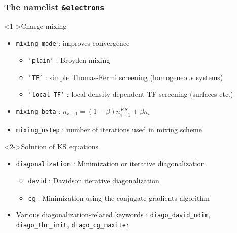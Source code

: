\documentclass[]{beamer}
\def\t#1{{\texttt{#1}}}
\begin{document}
\begin{frame}
  \frametitle{The namelist \t{\&electrons}}
  \begin{block}<1->{Charge mixing}
    \begin{itemize}
      \item \t{mixing\_mode} : improves convergence
        \begin{itemize}
          \item[] \t{'plain'} : Broyden mixing
          \item[] \t{'TF'} : simple Thomas-Fermi screening (homogeneous systems)
          \item[] \t{'local-TF'} : local-density-dependent TF screening
          (surfaces etc.)
        \end{itemize}
      \item \t{mixing\_beta} : $n_{i+1} = (1-\beta)n^{KS}_{i+1} + \beta n_i$
      \item \t{mixing\_nstep} : number of iterations used in mixing scheme
    \end{itemize}
  \end{block}

\begin{block}<2->{Solution of KS equations}
  \begin{itemize}
  \item \t{diagonalization} : Minimization or iterative diagonalization
    \begin{itemize}
    \item[] \t{david} : Davidson iterative diagonalization
    \item[] \t{cg} : Minimization using the conjugate-gradients
      algorithm 
    \end{itemize}
  \item Various diagonalization-related keywords :
    \t{diago\_david\_ndim}, \t{diago\_thr\_init}, \t{diago\_cg\_maxiter}
  \end{itemize}
\end{block}
\end{frame}
\end{document}
